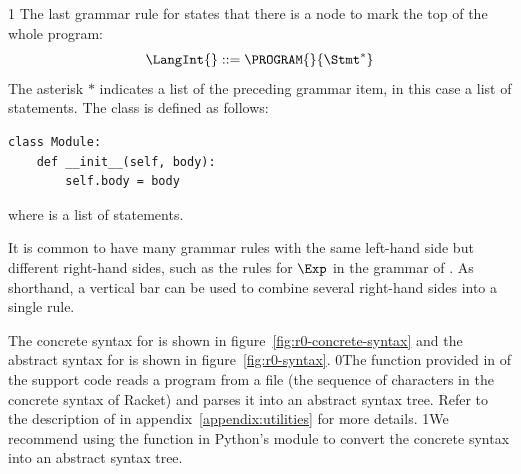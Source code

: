 \documentclass[7x10]{TimesAPriori_MIT}%
\def\racketEd{0}
\def\pythonEd{1}
\providecommand{\BookEdition}{1}
\let\edition\BookEdition
\newcommand{\racket}[1]{{\if\edition\racketEd{#1}\fi}}
\newcommand{\pythonColor}[0]{}
\newcommand{\python}[1]{{\if\edition\pythonEd\pythonColor #1\fi}}
\numberwithin{theorem}{chapter}
\numberwithin{definition}{chapter}
\numberwithin{equation}{chapter}
\begin{document}
{\if\edition\pythonEd\pythonColor
The last grammar rule for \LangInt{} states that there is a
 node to mark the top of the whole program:
\[
  \LangInt{} ::= \PROGRAM{}{\Stmt^{*}}
\]
The asterisk $*$ indicates a list of the preceding grammar item, in
this case a list of statements.
%
The  class is defined as follows:
\begin{lstlisting}
class Module:
    def __init__(self, body):
        self.body = body
\end{lstlisting}
where  is a list of statements.
\fi}

It is common to have many grammar rules with the same left-hand side
but different right-hand sides, such as the rules for $\Exp$ in the
grammar of \LangInt{}. As shorthand, a vertical bar can be used to
combine several right-hand sides into a single rule.

The concrete syntax for \LangInt{} is shown in
figure~\ref{fig:r0-concrete-syntax} and the abstract syntax for
\LangInt{} is shown in figure~\ref{fig:r0-syntax}. %
%
\racket{The  function provided in
  \code{utilities.rkt} of the support code reads a program from a file
  (the sequence of characters in the concrete syntax of Racket) and
  parses it into an abstract syntax tree. Refer to the description of
  \code{read-program} in appendix~\ref{appendix:utilities} for more
  details.}
%
\python{We recommend using the  function in Python's
  \code{ast} module to convert the concrete syntax into an abstract
  syntax tree.}

\newcommand{\LintGrammarRacket}{
  \begin{array}{rcl}
    \Type &::=& \key{Integer} \\
    \Exp{} &::=& \Int{} \MID \CREAD \MID \CNEG{\Exp} \MID \CADD{\Exp}{\Exp}
      \MID \CSUB{\Exp}{\Exp}
  \end{array}
}
\newcommand{\LintASTRacket}{
  \begin{array}{rcl}
    \Type &::=& \key{Integer} \\
    \Exp{} &::=& \INT{\Int} \MID \READ{} \\
           &\MID& \NEG{\Exp} \MID \ADD{\Exp}{\Exp} \MID \SUB{\Exp}{\Exp}
  \end{array}
}
\newcommand{\LintGrammarPython}{
\begin{array}{rcl}
  \Exp &::=& \Int \MID \key{input\_int}\LP\RP \MID \key{-}\;\Exp \MID \Exp \; \key{+} \; \Exp \MID \Exp \; \key{-} \; \Exp \MID \LP\Exp\RP \\
  \Stmt &::=& \key{print}\LP \Exp \RP \MID \Exp
\end{array}
}
\newcommand{\LintASTPython}{
  \begin{array}{rcl}
  \Exp{} &::=& \INT{\Int} \MID \READ{} \\
         &\MID& \UNIOP{\key{USub()}}{\Exp} \MID \BINOP{\Exp}{\key{Add()}}{\Exp}\\
         &\MID& \BINOP{\Exp}{\key{Sub()}}{\Exp}\\
  \Stmt{} &::=& \PRINT{\Exp} \MID \EXPR{\Exp} 
\end{array}
}
\end{document}
